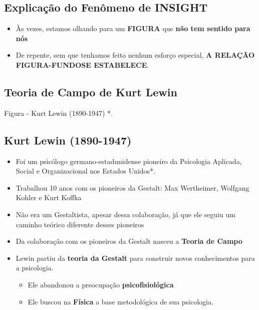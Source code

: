 \documentclass[
]{book}
\providecommand{\tightlist}{%
  \setlength{\itemsep}{0pt}\setlength{\parskip}{0pt}}
\begin{document}
\hypertarget{explicauxe7uxe3o-do-fenuxf4meno-de-insight}{%
\subsection{Explicação do Fenômeno de INSIGHT}\label{explicauxe7uxe3o-do-fenuxf4meno-de-insight}}

\begin{itemize}
\tightlist
\item
  Às vezes, estamos olhando para um \textbf{FIGURA} que \textbf{não tem sentido para nós}
\item
  De repente, sem que tenhamos feito nenhum esforço especial, \textbf{A RELAÇÃO FIGURA-FUNDOSE ESTABELECE}.
\end{itemize}

\hypertarget{teoria-de-campo-de-kurt-lewin}{%
\subsection{\texorpdfstring{Teoria de Campo de \textbf{Kurt Lewin}}{Teoria de Campo de Kurt Lewin}}\label{teoria-de-campo-de-kurt-lewin}}

Figura - Kurt Lewin (1890-1947) *.

\hypertarget{kurt-lewin-1890-1947}{%
\subsection{Kurt Lewin (1890-1947)}\label{kurt-lewin-1890-1947}}

\begin{itemize}
\tightlist
\item
  Foi um psicólogo germano-estadunidense pioneiro da Psicologia Aplicada, Social e Organizacional nos Estados Unidos*.
\item
  Trabalhou 10 anos com os pioneiros da Gestalt: Max Wertheimer, Wolfgang Kohler e Kurt Koffka
\item
  Não era um Gestaltista, apesar dessa colaboração, já que ele seguiu um caminho teórico diferente desses pioneiros
\item
  Da colaboração com os pioneiros da Gestalt nasceu a \textbf{Teoria de Campo}
\item
  Lewin partiu da \textbf{teoria da Gestalt} para construir novos conhecimentos para a psicologia.

  \begin{itemize}
  \tightlist
  \item
    Ele abandonou a preocupação \textbf{psicofisiológica}
  \item
    Ele buscou na \textbf{Física} a base metodológica de sua psicologia.
  \end{itemize}
\end{itemize}
\end{document}
